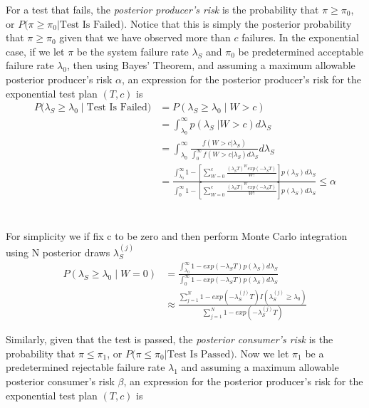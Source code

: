 \documentclass[12pt]{article}
\begin{document}
For a test that fails, the \emph{posterior producer's risk} is the probability
that $\pi \geq \pi_{0}$, or $P \text{(}\pi \ge \pi_0 \vert \text{Test Is
Failed)}$. Notice that this is simply the posterior probability that $\pi \ge
\pi_0$ given that we have observed more than $c$ failures. In the exponential
case, if we let $\pi$ be the system failure rate $\lambda_S$ and $\pi_0$ be
predetermined acceptable failure rate $\lambda_0$, then using Bayes' Theorem,
and assuming a maximum allowable posterior producer's risk $\alpha$, an
expression for the posterior producer's risk for the exponential test plan
$(T,c)$ is
$$
\begin{aligned}
    P(\lambda_S \geq \lambda_0 \; \vert \; \text{Test Is Failed)} &= P(\lambda_S
    \geq \lambda_0 \; \vert \; W > c) \\ &= \int_{\lambda_0}^{\infty}
    p(\lambda_S \; \vert W > c) d\lambda_S \\ &= \int_{\lambda_0}^{\infty}
    \frac{f(W > c \vert \lambda_S)}{\int_{0}^{\infty} f(W > c \vert \lambda_S)
    d\lambda_S} d\lambda_S \\ &= \frac{\int_{\lambda_0}^{\infty} 1 - [ \sum_{W=0}^c
    \frac{(\lambda_S T)^W exp(-\lambda_S T)}{W!}]p(\lambda_S)d\lambda_S}
    {\int_{0}^{\infty} 1 - [ \sum_{W=0}^c \frac{(\lambda_S T)^W exp(-\lambda_S
    T)}{W!}]p(\lambda_S)d\lambda_S} \leq \alpha
\end{aligned}
$$
\\
\\
For simplicity we if fix c to be zero and then perform Monte Carlo integration
using N posterior draws $ \lambda_S^{(j)} $
$$
\begin{aligned}
	 P(\lambda_S \geq \lambda_0 \; \vert \; W = 0) &=
	 \frac{\int_{\lambda_0}^{\infty} 1 - exp(-\lambda_S T)p(\lambda_S)d\lambda_S}
	 {\int_{0}^{\infty} 1 - exp(-\lambda_S T)p(\lambda_S)d\lambda_S} \\ &\approx
	 \frac{\sum_{j = 1}^{N} 1 - exp(-\lambda_S^{(j)} T)I(\lambda_S^{(j)} \geq
	 \lambda_0)} {\sum_{j = 1}^{N} 1 - exp(-\lambda_S^{(j)} T)} \end{aligned}
$$

Similarly, given that the test is passed, the \emph{posterior consumer's risk}
is the probability that $\pi \leq \pi_1$, or $P \text{(}\pi \leq \pi_0 \vert
\text{Test Is Passed)}$.  Now we let $\pi_1$ be a predetermined rejectable
failure rate $\lambda_1$ and assuming a maximum allowable posterior consumer's
risk $\beta$, an expression for the posterior producer's risk for the
exponential test plan $(T,c)$ is
\end{document}
